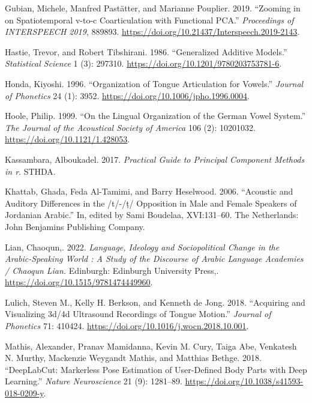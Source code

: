 \documentclass[
]{interact}
\newlength{\cslhangindent}
\newenvironment{CSLReferences}[2] %
 {\begin{list}{}{%
  \setlength{\itemindent}{0pt}
  \setlength{\leftmargin}{0pt}
  \setlength{\parsep}{0pt}
  \ifodd #1
   \setlength{\leftmargin}{\cslhangindent}
   \setlength{\itemindent}{-1\cslhangindent}
  \fi
  \setlength{\itemsep}{#2\baselineskip}}}
 {\end{list}}
\begin{document}
\begin{CSLReferences}{1}{0}
Gubian, Michele, Manfred Pastätter, and Marianne Pouplier. 2019.
{``Zooming in on Spatiotemporal v-to-c Coarticulation with Functional
PCA.''} \emph{Proceedings of INTERSPEECH 2019}, 889893.
\url{https://doi.org/10.21437/Interspeech.2019-2143}.

Hastie, Trevor, and Robert Tibshirani. 1986. {``Generalized Additive
Models.''} \emph{Statistical Science} 1 (3): 297310.
\url{https://doi.org/10.1201/9780203753781-6}.

Honda, Kiyoshi. 1996. {``Organization of Tongue Articulation for
Vowels.''} \emph{Journal of Phonetics} 24 (1): 3952.
\url{https://doi.org/10.1006/jpho.1996.0004}.

Hoole, Philip. 1999. {``On the Lingual Organization of the German Vowel
System.''} \emph{The Journal of the Acoustical Society of America} 106
(2): 10201032. \url{https://doi.org/10.1121/1.428053}.

Kassambara, Alboukadel. 2017. \emph{Practical Guide to Principal
Component Methods in r}. STHDA.

Khattab, Ghada, Feda Al-Tamimi, and Barry Heselwood. 2006. {``Acoustic
and Auditory Differences in the /t/-/ṭ/ Opposition in Male and Female
Speakers of Jordanian Arabic.''} In, edited by Sami Boudelaa,
XVI:131--60. The Netherlands: John Benjamins Publishing Company.

Lian, Chaoqun,. 2022. \emph{Language, Ideology and Sociopolitical Change
in the Arabic-Speaking World : A Study of the Discourse of Arabic
Language Academies / Chaoqun Lian.} Edinburgh: Edinburgh University
Press,. \url{https://doi.org/10.1515/9781474449960}.

Lulich, Steven M., Kelly H. Berkson, and Kenneth de Jong. 2018.
{``Acquiring and Visualizing 3d/4d Ultrasound Recordings of Tongue
Motion.''} \emph{Journal of Phonetics} 71: 410424.
\url{https://doi.org/10.1016/j.wocn.2018.10.001}.

Mathis, Alexander, Pranav Mamidanna, Kevin M. Cury, Taiga Abe, Venkatesh
N. Murthy, Mackenzie Weygandt Mathis, and Matthias Bethge. 2018.
{``DeepLabCut: Markerless Pose Estimation of User-Defined Body Parts
with Deep Learning.''} \emph{Nature Neuroscience} 21 (9): 1281--89.
\url{https://doi.org/10.1038/s41593-018-0209-y}.


\end{CSLReferences}
\end{document}

